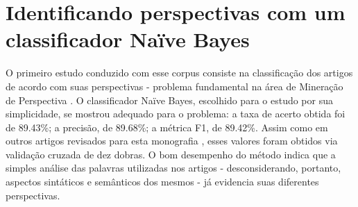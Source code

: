 







\section{Identificando perspectivas com um classificador Naïve Bayes}

O primeiro estudo conduzido com esse corpus consiste na classificação dos artigos de acordo com suas perspectivas - problema fundamental na área de Mineração de Perspectiva \cite{omsa}. O classificador Naïve Bayes, escolhido para o estudo por sua simplicidade, se mostrou adequado para o problema: a taxa de acerto obtida foi de 89.43\%; a precisão, de  89.68\%; a métrica F1, de 89.42\%. Assim como em outros artigos revisados para esta monografia \cite{lin-et-al2006} \cite{aaai-politics} \cite{klebanov}, esses valores foram obtidos via validação cruzada de dez dobras. O bom desempenho do método indica que a simples análise das palavras utilizadas nos artigos - desconsiderando, portanto, aspectos sintáticos e semânticos dos mesmos - já evidencia suas diferentes perspectivas. 




